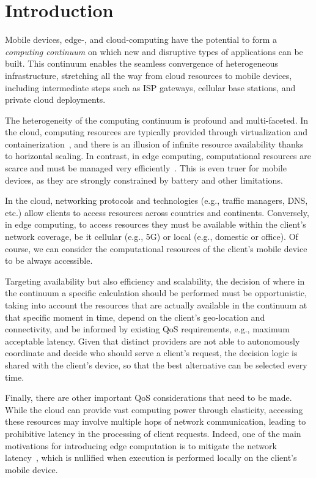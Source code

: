\section{Introduction}
\label{sec:intro}

Mobile devices, edge-, and cloud-computing have the potential to form a \textit{computing continuum} on which new and disruptive types of applications can be built. This continuum enables the seamless convergence of heterogeneous infrastructure, stretching all the way from cloud resources to mobile devices, including intermediate steps such as ISP gateways, cellular base stations, and private cloud deployments.

The heterogeneity of the computing continuum is profound and multi-faceted. In the cloud, computing resources are typically provided through virtualization and containerization~\cite{leitner2016patterns, Quatrocchi2016discrete}, and there is an illusion of infinite resource availability thanks to horizontal scaling. In contrast, in edge computing, computational resources are scarce and must be managed very efficiently~\cite{Shi:2016, GarrigaMendonca2017}. This is even truer for mobile devices, as they are strongly constrained by battery and other limitations. 

In the cloud, networking protocols and technologies (e.g., traffic managers, DNS, etc.) allow clients to access resources across countries and continents. Conversely, in edge computing, to access resources they must be available within the client's network coverage, be it cellular (e.g., 5G) or local (e.g., domestic or office). Of course, we can consider the computational resources of the client's mobile device to be always accessible. %

Targeting availability but also efficiency and scalability, the decision of where in the continuum a specific calculation should be performed must be opportunistic, taking into account the resources that are actually available in the continuum at that specific moment in time, depend on the client's geo-location and connectivity, and be informed by existing QoS requirements, e.g., maximum acceptable latency. Given that distinct providers are not able to autonomously coordinate and decide who should serve a client's request, the decision logic is shared with the client's device, so that the best alternative can be selected every time.

Finally, there are other important QoS considerations that need to be made. While the cloud can provide vast computing power through elasticity, accessing these resources may involve multiple hops of network communication, leading to prohibitive latency in the processing of client requests. Indeed, one of the main motivations for introducing edge computation is to mitigate the network latency~\cite{Shi:2016}, which is nullified when execution is performed locally on the client's mobile device.

